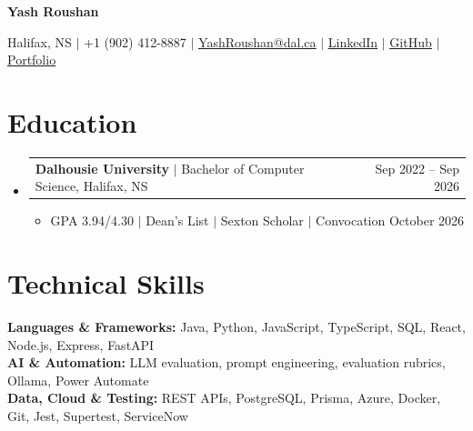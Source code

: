 \documentclass[letterpaper,11pt]{article}
\makeatletter
\newcommand{\resumeBodyFont}{
  \fontsize{10.2pt}{11.2pt}\selectfont
}
\newcommand{\resumeMetaFont}{
  \fontsize{9.7pt}{10.8pt}\selectfont
}
\newcommand{\resumeItem}[1]{
  \item{\resumeBodyFont #1}
}
\newcommand{\resumeEducationHeading}[2]{
  \item
    \begin{tabularx}{\textwidth}[t]
      {@{}>{\raggedright\arraybackslash}Xr@{}}
      \resumeBodyFont #1 & \resumeBodyFont #2 \\
    \end{tabularx}
    \vspace{-5pt}
}
\newcommand{\resumeSubHeadingListStart}{
  \begin{itemize}[
    leftmargin=0in,
    label={},
    itemsep=7pt,
    topsep=1pt,
    parsep=0pt,
    partopsep=0pt
  ]
}
\newcommand{\resumeSubHeadingListEnd}{
  \end{itemize}
  \vspace{-3pt}
}
\newcommand{\resumeItemListStart}{
  \vspace{-2pt}
  \begin{itemize}[
    leftmargin=0.25in,
    itemsep=4pt,
    topsep=0pt,
    parsep=0pt,
    partopsep=0pt
  ]
}
\newcommand{\resumeItemListEnd}{
  \end{itemize}
  \vspace{-3pt}
}
\makeatother
\begin{document}
\begin{center}
  {\fontsize{23pt}{25pt}\selectfont\textbf{Yash Roushan}} \\[-1pt]
  {\resumeMetaFont
    Halifax, NS $|$ +1 (902) 412-8887 $|$
    \href{mailto:yashroushan@dal.ca}{\underline{YashRoushan@dal.ca}} $|$
    \href{https://www.linkedin.com/in/yash-roushan-8636a1242/}{\underline{LinkedIn}} $|$
    \href{https://github.com/YashRoushan}{\underline{GitHub}} $|$
    \href{https://yashroushan.github.io/portfolio-website/engineering/}{\underline{Portfolio}}
  }
\end{center}
\vspace{-7pt}
\section{Education}
\resumeSubHeadingListStart
  \resumeEducationHeading
    {\textbf{Dalhousie University} $|$ Bachelor of Computer Science, Halifax, NS}{Sep 2022 -- Sep 2026}
  \resumeItemListStart
  \resumeItem{GPA 3.94/4.30 $|$ Dean's List $|$ Sexton Scholar $|$ Convocation October 2026}
  \resumeItemListEnd
\resumeSubHeadingListEnd
\section{Technical Skills}
{\resumeBodyFont
\noindent
\textbf{Languages \& Frameworks:} Java, Python, JavaScript, TypeScript, SQL, React, Node.js, Express, FastAPI\\
\textbf{AI \& Automation:} LLM evaluation, prompt engineering, evaluation rubrics, Ollama, Power Automate\\
\textbf{Data, Cloud \& Testing:} REST APIs, PostgreSQL, Prisma, Azure, Docker, Git, Jest, Supertest, ServiceNow
}
\end{document}
